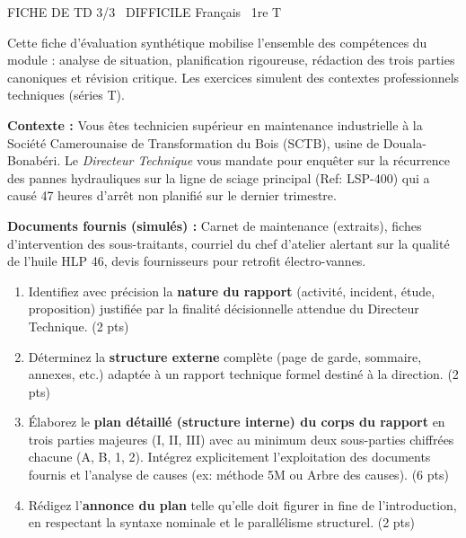 \documentclass[11pt]{article}
\begin{document}
\pagestyle{empty}

\begin{tcolorbox}[enhanced,colback=popink,colframe=popink,arc=10pt,boxrule=0pt,left=12pt,right=12pt,top=9pt,bottom=9pt]
{\color{white}\popxbold\small FICHE DE TD 3/3 \textbullet\ DIFFICILE \hfill Français \textbullet\ 1re T\par}
\end{tcolorbox}
\vspace{4pt}

\noindent Cette fiche d'évaluation synthétique mobilise l'ensemble des compétences du module : analyse de situation, planification rigoureuse, rédaction des trois parties canoniques et révision critique. Les exercices simulent des contextes professionnels techniques (séries T).

\begin{exercice}
\textbf{Contexte :} Vous êtes technicien supérieur en maintenance industrielle à la Société Camerounaise de Transformation du Bois (SCTB), usine de Douala-Bonabéri. Le \textit{Directeur Technique} vous mandate pour enquêter sur la récurrence des pannes hydrauliques sur la ligne de sciage principal (Ref: LSP-400) qui a causé 47 heures d'arrêt non planifié sur le dernier trimestre.

\textbf{Documents fournis (simulés) :} Carnet de maintenance (extraits), fiches d'intervention des sous-traitants, courriel du chef d'atelier alertant sur la qualité de l'huile HLP 46, devis fournisseurs pour retrofit électro-vannes.

\begin{enumerate}
    \item Identifiez avec précision la \textbf{nature du rapport} (activité, incident, étude, proposition) justifiée par la finalité décisionnelle attendue du Directeur Technique. (2 pts)
    \item Déterminez la \textbf{structure externe} complète (page de garde, sommaire, annexes, etc.) adaptée à un rapport technique formel destiné à la direction. (2 pts)
    \item Élaborez le \textbf{plan détaillé (structure interne) du corps du rapport} en trois parties majeures (I, II, III) avec au minimum deux sous-parties chiffrées chacune (A, B, 1, 2). Intégrez explicitement l'exploitation des documents fournis et l'analyse de causes (ex: méthode 5M ou Arbre des causes). (6 pts)
    \item Rédigez l'\textbf{annonce du plan} telle qu'elle doit figurer in fine de l'introduction, en respectant la syntaxe nominale et le parallélisme structurel. (2 pts)
\end{enumerate}
\end{exercice}
\end{document}
